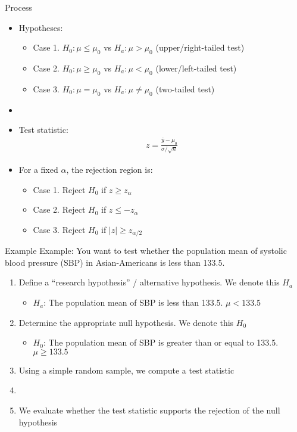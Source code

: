 \documentclass[xcolor=dvipsnames]{beamer}
\begin{document}
\begin{frame}{Process}
	\begin{itemize}
		\item Hypotheses:  \pause
		\begin{itemize}
			\item Case 1. $H_0: \mu \leq \mu_0$ vs $H_a: \mu > \mu_0$ (upper/right-tailed test) \pause
			\item Case 2. $H_0: \mu \geq \mu_0$ vs $H_a: \mu < \mu_0$ (lower/left-tailed test) \pause
			\item Case 3. $H_0: \mu = \mu_0$ vs $H_a: \mu \neq \mu_0$ (two-tailed test) \pause
		\end{itemize}
		\item[]
		\item Test statistic:
		\begin{gather*}
					z = \frac{\bar{y} - \mu_0}{\sigma / \sqrt{n}}
		\end{gather*} \pause
		
		\item For a fixed $\alpha$, the rejection region is:
		\begin{itemize}
			\item Case 1. Reject $H_0$ if $z \geq z_{\alpha}$  \pause
			\item Case 2. Reject $H_0$ if $z \leq -z_{\alpha}$  \pause
			\item Case 3. Reject $H_0$ if $|z| \geq z_{\alpha/2}$ 
		\end{itemize}
		
	\end{itemize}
\end{frame}

\begin{frame}{Example}
	Example: You want to test whether the population mean of systolic blood pressure (SBP) in Asian-Americans is less than 133.5. \\
	\vspace{10 pt}
	\begin{enumerate}
		\item Define a ``research hypothesis'' / alternative hypothesis. We denote this $H_a$
		\begin{itemize}
			\item $H_a$: The population mean of SBP is less than 133.5. $\mu < 133.5$
		\end{itemize}
		\item Determine the appropriate null hypothesis. We denote this $H_0$
		\begin{itemize}
			\item $H_0$: The population mean of SBP is greater than or equal to 133.5. $\mu \geq 133.5$
		\end{itemize}
		\item Using a simple random sample, we compute a test statistic
		\item[]
		\item We evaluate whether the test statistic supports the rejection of the null hypothesis
	\end{enumerate}
\end{frame}
\end{document}
